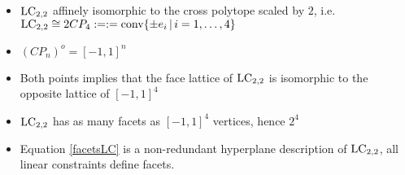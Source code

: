 \begin{frame}
	\begin{itemize}
		\begin{block}{Claim}
			\begin{equation}\label{facetsLC}
			\LC_{2,2} = \{ A \in \mathbb{R}^{2 \times 2} \, | \, -1 \le  \trace{AM} \le 1 \textup{ for all } M \in \mathcal{K} \},
			\end{equation}
			where $ \mathcal{K}  = \{ \frac{1}{2}\sigma(\begin{pmatrix}
			-1 & 1 \\
			1 & 1
			\end{pmatrix}), \sigma(\begin{pmatrix}
			1 & 0 \\
			0 & 0
			\end{pmatrix}) \, | \,  \sigma \in \{ \textup{id} (1 \, \, 2), (1 \, \, 3), (1 \, \, 4) \} \} $.
		\end{block}
		\item<2-> $ \textup{LC}_{2,2} $ affinely isomorphic to the cross polytope scaled by $ 2 $, i.e. $ \textup{LC}_{2,2} \cong 2CP_4 := := \textup{conv} \{  \pm e_i \, | \, i = 1,\hdots,4 \}$
		\item<3-> $ (CP_n)^o = [-1,1]^n $
		\item<4-> Both points implies that the face lattice of $ \textup{LC}_{2,2} $ is isomorphic to the opposite lattice of $ [-1,1]^4 $
		\item<5-> $ \textup{LC}_{2,2} $ has as many facets as $ [-1,1]^4 $ vertices, hence $ 2^4 $
		\item<6-> Equation \ref{facetsLC} is a non-redundant hyperplane description of $ \textup{LC}_{2,2} $, all linear constraints define facets.
	\end{itemize}
\end{frame}
